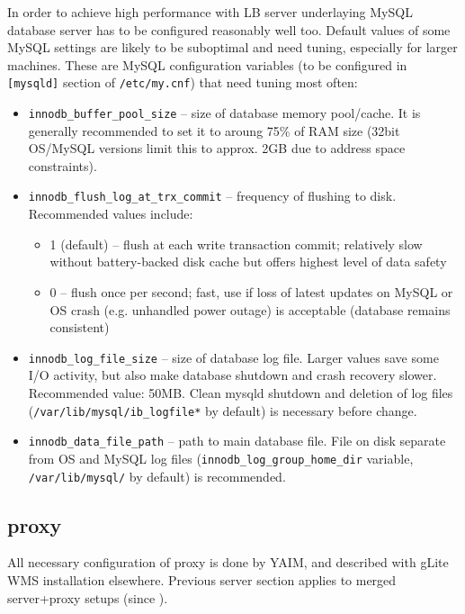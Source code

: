 In order to achieve high performance with LB server underlaying MySQL 
database server has to be configured reasonably well too. 
Default values of some MySQL settings are likely to be suboptimal
and need tuning, especially for larger machines.
These are MySQL configuration variables (to be configured in \texttt{[mysqld]} 
section of \texttt{/etc/my.cnf}) that need tuning most often:
\begin{itemize}
\item \texttt{innodb\_buffer\_pool\_size} -- size of database memory pool/cache. 
It is generally recommended to set it to aroung 75\% of RAM size
(32bit OS/MySQL versions limit this to approx. 2GB due to address space 
constraints).

\item \texttt{innodb\_flush\_log\_at\_trx\_commit} -- frequency of flushing to disk.
Recommended values include:
\begin{itemize}
\item 1 (default) -- flush at each write transaction commit; relatively
slow without battery-backed disk cache but offers highest level of data safety
\item 0 -- flush once per second; fast, use if loss of latest updates on MySQL
or OS crash (e.g. unhandled power outage) is acceptable (database remains consistent)
\end{itemize}

\item \texttt{innodb\_log\_file\_size} -- size of database log file. Larger values
save some I/O activity, but also make database shutdown and crash recovery slower.
Recommended value: 50MB. Clean mysqld shutdown and deletion of log files 
(\texttt{/var/lib/mysql/ib\_logfile*} by default) is necessary before change.

\item \texttt{innodb\_data\_file\_path} -- path to main database file. File on
disk separate from OS and MySQL log files (\texttt{innodb\_log\_group\_home\_dir} variable,
\texttt{/var/lib/mysql/} by default) is recommended.

\end{itemize}

\subsection{\LB proxy}
\label{inst:LBproxy}


All necessary configuration of \LB proxy is done by YAIM,
and described with gLite WMS installation elsewhere.
Previous \LB server section applies to merged server+proxy setups (since ).

